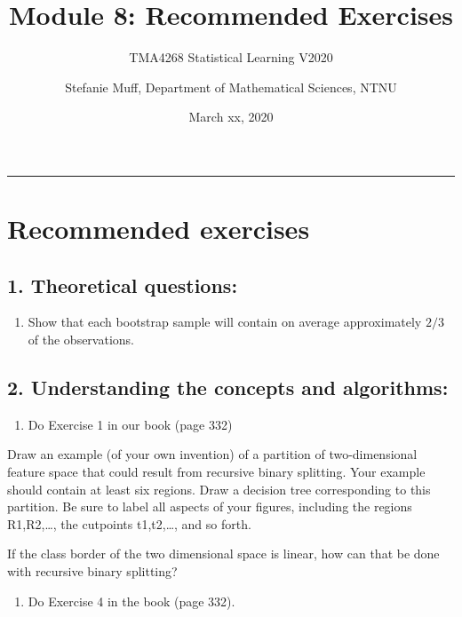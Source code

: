 \documentclass[]{article}
\title{Module 8: Recommended Exercises}
\subtitle{TMA4268 Statistical Learning V2020}
\author{Stefanie Muff, Department of Mathematical Sciences, NTNU}
\date{March xx, 2020}
\providecommand{\tightlist}{%
  \setlength{\itemsep}{0pt}\setlength{\parskip}{0pt}}
\begin{document}
\maketitle

{
\hypersetup{linkcolor=black}
\setcounter{tocdepth}{2}
\tableofcontents
}
\begin{center}\rule{0.5\linewidth}{\linethickness}\end{center}

\section{Recommended exercises}\label{recommended-exercises}

\subsection{1. Theoretical questions:}\label{theoretical-questions}

\begin{enumerate}
\def\labelenumi{\alph{enumi})}
\tightlist
\item
  Show that each bootstrap sample will contain on average approximately
  \(2/3\) of the observations.
\end{enumerate}

\subsection{2. Understanding the concepts and
algorithms:}\label{understanding-the-concepts-and-algorithms}

\begin{enumerate}
\def\labelenumi{\alph{enumi})}
\tightlist
\item
  Do Exercise 1 in our book (page 332)
\end{enumerate}

Draw an example (of your own invention) of a partition of
two-dimensional feature space that could result from recursive binary
splitting. Your example should contain at least six regions. Draw a
decision tree corresponding to this partition. Be sure to label all
aspects of your figures, including the regions R1,R2,\ldots{}, the
cutpoints t1,t2,\ldots{}, and so forth.

If the class border of the two dimensional space is linear, how can that
be done with recursive binary splitting?

\begin{enumerate}
\def\labelenumi{\alph{enumi})}
\setcounter{enumi}{1}
\tightlist
\item
  Do Exercise 4 in the book (page 332).
\end{enumerate}
\end{document}
